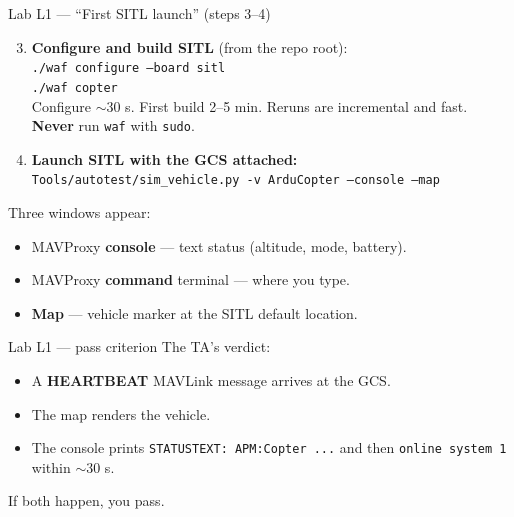 \documentclass[aspectratio=169,11pt]{beamer}
\begin{document}
\begin{frame}{Lab L1 --- ``First SITL launch'' (steps 3--4)}
  \begin{enumerate}\setcounter{enumi}{2}
    \item \textbf{Configure and build SITL} (from the repo root):\\
      \quad \texttt{./waf configure --board sitl}\\
      \quad \texttt{./waf copter}\\
      Configure $\sim$30 s. First build 2--5 min. Reruns are incremental and fast.\\
      \textbf{Never} run \texttt{waf} with \texttt{sudo}.
    \item \textbf{Launch SITL with the GCS attached:}\\
      \quad \texttt{Tools/autotest/sim\_vehicle.py -v ArduCopter --console --map}
  \end{enumerate}
  Three windows appear:
  \begin{itemize}
    \item MAVProxy \textbf{console} --- text status (altitude, mode, battery).
    \item MAVProxy \textbf{command} terminal --- where you type.
    \item \textbf{Map} --- vehicle marker at the SITL default location.
  \end{itemize}
\end{frame}

\begin{frame}{Lab L1 --- pass criterion}
  The TA's verdict:
  \begin{itemize}
    \item A \textbf{HEARTBEAT} MAVLink message arrives at the GCS.
    \item The map renders the vehicle.
    \item The console prints \texttt{STATUSTEXT: APM:Copter ...} and then \texttt{online system 1} within $\sim$30 s.
  \end{itemize}
  If both happen, you pass.
\end{frame}
\end{document}
